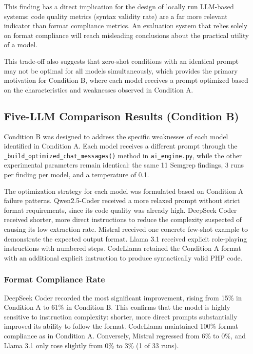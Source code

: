 This finding has a direct implication for the design of locally run LLM-based systems: code quality metrics (syntax validity rate) are a far more relevant indicator than format compliance metrics. An evaluation system that relies solely on format compliance will reach misleading conclusions about the practical utility of a model.

This trade-off also suggests that zero-shot conditions with an identical prompt may not be optimal for all models simultaneously, which provides the primary motivation for Condition B, where each model receives a prompt optimized based on the characteristics and weaknesses observed in Condition A.

\subsection{Five-LLM Comparison Results (Condition B)}

Condition B was designed to address the specific weaknesses of each model identified in Condition A. Each model receives a different prompt through the \texttt{\_build\_optimized\_chat\_messages()} method in \texttt{ai\_engine.py}, while the other experimental parameters remain identical: the same 11 Semgrep findings, 3 runs per finding per model, and a temperature of 0.1.

The optimization strategy for each model was formulated based on Condition A failure patterns. Qwen2.5-Coder received a more relaxed prompt without strict format requirements, since its code quality was already high. DeepSeek Coder received shorter, more direct instructions to reduce the complexity suspected of causing its low extraction rate. Mistral received one concrete few-shot example to demonstrate the expected output format. Llama 3.1 received explicit role-playing instructions with numbered steps. CodeLlama retained the Condition A format with an additional explicit instruction to produce syntactically valid PHP code.

\subsubsection{Format Compliance Rate}

DeepSeek Coder recorded the most significant improvement, rising from 15\% in Condition A to 61\% in Condition B. This confirms that the model is highly sensitive to instruction complexity: shorter, more direct prompts substantially improved its ability to follow the format. CodeLlama maintained 100\% format compliance as in Condition A. Conversely, Mistral regressed from 6\% to 0\%, and Llama 3.1 only rose slightly from 0\% to 3\% (1 of 33 runs).

